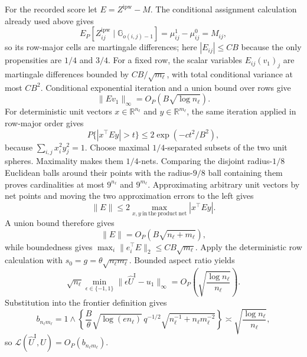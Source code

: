 For the recorded score let \(E=Z^{\mathrm{ipw}}-M\).  The conditional assignment calculation already used above gives
\[
 E_P[Z^{\mathrm{ipw}}_{ij}\mid\mathbb G_{o(i,j)-1}]
 =\mu^1_{ij}-\mu^0_{ij}=M_{ij},
\]
so its row-major cells are martingale differences; here \(|E_{ij}|\le C B\) because the only propensities are \(1/4\) and \(3/4\).  For a fixed row, the scalar variables \(E_{ij}(v_1)_j\) are martingale differences bounded by \(CB/\sqrt{m_\ell}\), with total conditional variance at most \(CB^2\).  Conditional exponential iteration and a union bound over rows give
\[
 \lVert Ev_1\rVert_\infty=O_P(B\sqrt{\log n_\ell}).
\]
For deterministic unit vectors \(x\in\mathbb R^{n_\ell}\) and \(y\in\mathbb R^{m_\ell}\), the same iteration applied in row-major order gives
\[
 P\{|x^\top Ey|>t\}\le2\exp(-ct^2/B^2),
\]
because \(\sum_{i,j}x_i^2y_j^2=1\).  Choose maximal \(1/4\)-separated subsets of the two unit spheres.  Maximality makes them \(1/4\)-nets.  Comparing the disjoint radius-\(1/8\) Euclidean balls around their points with the radius-\(9/8\) ball containing them proves cardinalities at most \(9^{n_\ell}\) and \(9^{m_\ell}\).  Approximating arbitrary unit vectors by net points and moving the two approximation errors to the left gives
\[
 \lVert E\rVert
 \le2\max_{x,y\ \mathrm{in\ the\ product\ net}}|x^\top Ey|.
\]
A union bound therefore gives
\[
 \lVert E\rVert=O_P(B\sqrt{n_\ell+m_\ell}),
\]
while boundedness gives \(\max_i\lVert e_i^\top E\rVert_2\le CB\sqrt{m_\ell}\).  Apply the deterministic row calculation with \(s_0=g=\theta\sqrt{n_\ell m_\ell}\).  Bounded aspect ratio yields
\[
 \sqrt{n_\ell}\min_{\epsilon\in\{-1,1\}}
 \lVert\epsilon\widehat U^{\mathrm I}-u_1\rVert_\infty
 =O_P\!\left(\sqrt{\frac{\log n_\ell}{n_\ell}}\right).
\]
Substitution into the frontier definition gives
\[
 b_{n_\ell m_\ell}
 =1\wedge\left\{
 \frac B\theta\sqrt{\log(en_\ell)}\,
 q^{-1/2}\sqrt{n_\ell^{-1}+n_\ell m_\ell^{-2}}
 \right\}
 \asymp\sqrt{\frac{\log n_\ell}{n_\ell}},
\]
so \(\mathcal L(\widehat U^{\mathrm I},U)=O_P(b_{n_\ell m_\ell})\).

